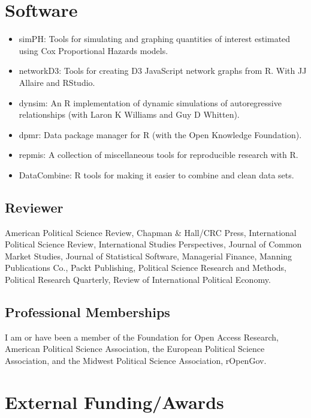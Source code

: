 \documentclass[a4paper]{article}
\begin{document}
{\section*{Software}

\begin{itemize}
    \item simPH: Tools for simulating and graphing quantities of interest estimated using Cox Proportional Hazards models.
    \item networkD3: Tools for creating D3 JavaScript network graphs from R. With JJ Allaire and RStudio.
    \item dynsim: An R implementation of dynamic simulations of autoregressive relationships (with Laron K Williams and Guy D Whitten).
    \item dpmr: Data package manager for R (with the Open Knowledge Foundation).
    \item repmis: A collection of miscellaneous tools for reproducible research with R.
    \item DataCombine: R tools for making it easier to combine and clean data sets.
\end{itemize}

\subsection*{Reviewer}

American Political Science Review, Chapman \& Hall/CRC Press,
International Political Science Review, International Studies Perspectives,
Journal of Common Market Studies, Journal of Statistical Software,
Managerial Finance, Manning Publications Co.,
Packt Publishing, Political Science Research and Methods, Political Research
Quarterly, Review of International Political Economy.

\subsection*{Professional Memberships}

I am or have been a member of the Foundation for Open Access Research, American Political Science Association, the European Political Science Association, and the Midwest Political Science Association, rOpenGov.

\section*{External Funding/Awards}

}
\end{document}
